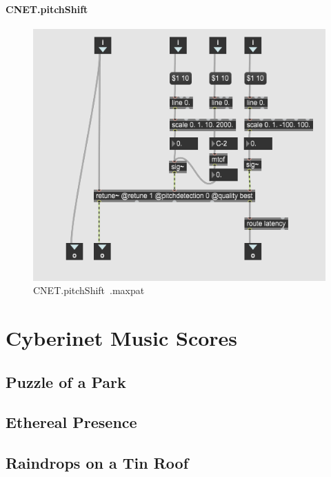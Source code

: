 \subsubsection{CNET.pitchShift~}

\begin{figure}
    \centering
    \includegraphics{diagrams/maxPatches/CNET.pitchShift~.png}
    \caption{CNET.pitchShift~.maxpat}
    \label{fig:pitchshift}
\end{figure}

\chapter{Cyberinet Music Scores}
\section{Puzzle of a Park}



\section{Ethereal Presence}



\section{Raindrops on a Tin Roof}

